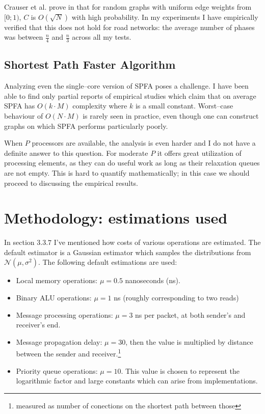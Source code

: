 \documentclass[12pt,a4paper,oneside,openright]{report}
\begin{document}
Crauser et al. prove in \cite{dijkstra} that for random graphs with uniform edge weights from $[0;1)$, $C$ is $O(\sqrt{N})$ with high probability. In my experiments I have empirically verified that this does not hold for road networks: the average number of phases was between $\frac{n}{4}$ and $\frac{n}{3}$ across all my tests.

\subsection{Shortest Path Faster Algorithm}
Analyzing even the single--core version of SPFA poses a challenge. I have been able to find only partial reports of empirical studies which claim that on average SPFA has $O(k\cdot M)$ complexity where $k$ is a small constant. Worst--case behaviour of $O(N\cdot M)$ is rarely seen in practice, even though one can construct graphs on which SPFA performs particularly poorly. 

When $P$ processors are available, the analysis is even harder and I do not have a definite answer to this question. For moderate $P$ it offers great utilization of processing elements, as they can do useful work as long as their relaxation queues are not empty. This is hard to quantify mathematically; in this case we should proceed to discussing the empirical results.

\section{Methodology: estimations used}
In section $3.3.7$ I've mentioned how costs of various operations are estimated. The default estimator is a Gaussian estimator which samples the distributions from $\mathcal{N}(\mu, \sigma ^2)$. The following default estimations are used:

\begin{itemize}
    \item Local memory operations: $\mu=0.5$ nanoseconds (ns). 
    \item Binary ALU operations: $\mu=1$ ns (roughly corresponding to two reads)
    \item Message processing operations: $\mu=3$ ns per packet, at both sender's and receiver's end.
    \item Message propagation delay: $\mu=30$, then the value is multiplied by distance between the sender and receiver.\footnote{measured as number of conections on the shortest path between those}
    \item Priority queue operations: $\mu=10$. This value is chosen to represent the logarithmic factor and large constants which can arise from implementations.
\end{itemize}
\end{document}
